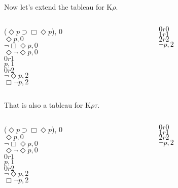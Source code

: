 \documentclass[
  14pt,
  letterpaper,
  ignorenonframetext,
]{beamer}
\begin{document}
\begin{frame}
Now let's extend the tableau for K\(\rho\).

\begin{columns}[T]
\begin{column}{0.48\textwidth}
\begin{center}
\neg($\Diamond p \supset \Box \Diamond p$), 0 \\
$\Diamond p, 0$ \\
$\neg \Box \Diamond p, 0$ \\
$\Diamond \neg \Diamond p, 0$ \\
$0r1$ \\
$p, 1$ \\
$0r2$ \\
$\neg \Diamond p, 2$ \\
$\Box \neg p, 2$
\end{center}
\end{column}

\begin{column}{0.48\textwidth}
\begin{center}
$0r0$ \\
$1r1$ \\
$2r2$ \\
$\neg p, 2$
\end{center}
\end{column}
\end{columns}
\end{frame}

\begin{frame}
That is also a tableau for K\(\rho \tau\).

\begin{columns}[T]
\begin{column}{0.48\textwidth}
\begin{center}
\neg($\Diamond p \supset \Box \Diamond p$), 0 \\
$\Diamond p, 0$ \\
$\neg \Box \Diamond p, 0$ \\
$\Diamond \neg \Diamond p, 0$ \\
$0r1$ \\
$p, 1$ \\
$0r2$ \\
$\neg \Diamond p, 2$ \\
$\Box \neg p, 2$
\end{center}
\end{column}

\begin{column}{0.48\textwidth}
\begin{center}
$0r0$ \\
$1r1$ \\
$2r2$ \\
$\neg p, 2$
\end{center}
\end{column}
\end{columns}
\end{frame}
\end{document}

